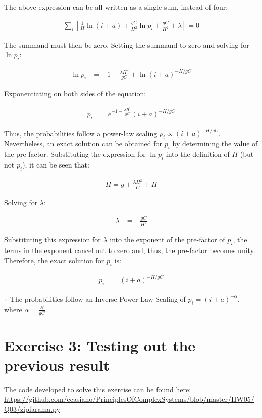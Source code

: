 \documentclass{article}
\begin{document}
The above expression can be all written as a single sum, instead of four:

\begin{align}
\sum_{i}[\frac{1}{H} \ln(i+a) + \frac{gC}{H^2} \ln p_i + \frac{gC}{H^2} + \lambda] = 0
\end{align}

The summand must then be zero. Setting the summand to zero and solving for $\ln p_i$:

\begin{align}
\ln p_i &= -1-\frac{\lambda H^2}{gC} + \ln(i+a)^{-H/gC}
\end{align}

Exponentiating on both sides of the equation:

\begin{align}
p_i &= e^{-1-\frac{\lambda H^2}{gC}}(i+a)^{-H/gC}
\end{align}

Thus, the probabilities follow a power-law scaling $p_i \propto (i+a)^{-H/gC}$. Nevertheless, an exact solution can be obtained for $p_i$ by determining the value of the pre-factor. Substituting the expression for $\ln p_i$ into the definition of $H$ (but not $p_i$), it can be seen that:

\begin{align}
H = g + \frac{\lambda H^2}{C} + H
\end{align}

Solving for $\lambda$:

\begin{align}
\lambda &= -\frac{gC}{H^2}
\end{align}

Substituting this expression for $\lambda$ into the exponent of the pre-factor of $p_i$, the terms in the exponent cancel out to zero and, thus, the pre-factor becomes unity. Therefore, the exact solution for $p_i$ is:

\begin{align}
p_i &= (i+a)^{-H/gC}
\end{align}

$\therefore$ The probabilities follow an Inverse Power-Law Scaling of $p_i = (i+a)^{-\alpha}$, where $\alpha = \frac{H}{gC}$.

\section{Exercise 3: Testing out the previous result}

The code developed to solve this exercise can be found here: \url{https://github.com/ecasiano/PrinciplesOfComplexSystems/blob/master/HW05/Q03/zipfarama.py} 
\end{document}
